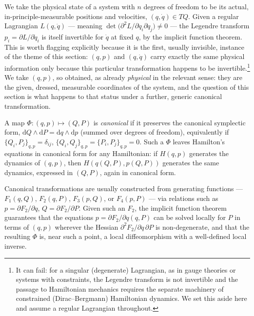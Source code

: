 We take the physical state of a system with $n$ degrees of freedom to be its
actual, in-principle-measurable positions and velocities, $(q,\dot q)\in TQ$.
Given a regular Lagrangian $L(q,\dot q)$ --- meaning $\det\!\big(\partial^2
L/\partial \dot q_i\partial \dot q_j\big)\neq0$ --- the Legendre transform
$p_i=\partial L/\partial \dot q_i$ is itself invertible for $\dot q$ at fixed
$q$, by the implicit function theorem. This is worth flagging explicitly
because it is the first, usually invisible, instance of the theme of this section:
$(q,p)$ and $(q,\dot q)$ carry exactly the same physical information only
because this particular transformation happens to be invertible.\footnote{It
can fail: for a singular (degenerate) Lagrangian, as in gauge theories or
systems with constraints, the Legendre transform is not invertible and the
passage to Hamiltonian mechanics requires the separate machinery of constrained
(Dirac--Bergmann) Hamiltonian dynamics. We set this aside here and assume a
regular Lagrangian throughout.} We take $(q,p)$, so obtained, as already
\emph{physical} in the relevant sense: they are the given, dressed, measurable
coordinates of the system, and the question of this section is what happens to
that status under a further, generic canonical transformation.

\begin{definition}
A map $\Phi:(q,p)\mapsto(Q,P)$ is \emph{canonical} if it preserves the
    canonical symplectic form, $\mathrm{d} Q\wedge\mathrm{d} P=\mathrm{d}
    q\wedge \mathrm{d} p$ (summed over degrees of freedom), equivalently if
    $\{Q_i,P_j\}_{q,p}=\delta_{ij}$, $\{Q_i,Q_j\}_{q,p}=\{P_i,P_j\}_{q,p}=0$.
    Such a $\Phi$ leaves Hamilton's equations in canonical form for any
    Hamiltonian: if $H(q,p)$ generates the dynamics of $(q,p)$, then
    $H(q(Q,P),p(Q,P))$ generates the same dynamics, expressed in $(Q,P)$, again
    in canonical form.
\end{definition}

Canonical transformations are usually constructed from generating functions
--- $F_1(q,Q)$, $F_2(q,P)$, $F_3(p,Q)$, or $F_4(p,P)$ --- via relations such as
$p=\partial F_2/\partial q$, $Q=\partial F_2/\partial P$. Given such an $F_2$,
the implicit function theorem guarantees that the equations $p=\partial
F_2/\partial q(q,P)$ can be solved locally for $P$ in terms of $(q,p)$ wherever
the Hessian $\partial^2F_2/\partial q\,\partial P$ is non-degenerate, and that
the resulting $\Phi$ is, near such a point, a local diffeomorphism with a
well-defined local inverse.

